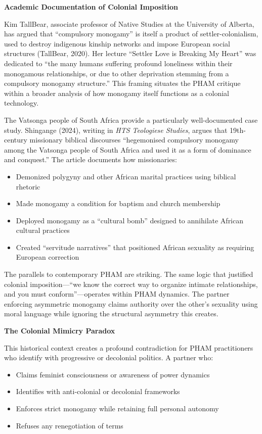 \documentclass[12pt, letterpaper]{article}
\begin{document}
\textbf{Academic Documentation of Colonial Imposition}

Kim TallBear, associate professor of Native Studies at the University of Alberta, has argued that ``compulsory monogamy'' is itself a product of settler-colonialism, used to destroy indigenous kinship networks and impose European social structures (TallBear, 2020). Her lecture ``Settler Love is Breaking My Heart'' was dedicated to ``the many humans suffering profound loneliness within their monogamous relationships, or due to other deprivation stemming from a compulsory monogamy structure.'' This framing situates the PHAM critique within a broader analysis of how monogamy itself functions as a colonial technology.

The Vatsonga people of South Africa provide a particularly well-documented case study. Shingange (2024), writing in \textit{HTS Teologiese Studies}, argues that 19th-century missionary biblical discourses ``hegemonised compulsory monogamy among the Vatsonga people of South Africa and used it as a form of dominance and conquest.'' The article documents how missionaries:

\begin{itemize}
    \item Demonized polygyny and other African marital practices using biblical rhetoric
    \item Made monogamy a condition for baptism and church membership
    \item Deployed monogamy as a ``cultural bomb'' designed to annihilate African cultural practices
    \item Created ``servitude narratives'' that positioned African sexuality as requiring European correction
\end{itemize}

The parallels to contemporary PHAM are striking. The same logic that justified colonial imposition---``we know the correct way to organize intimate relationships, and you must conform''---operates within PHAM dynamics. The partner enforcing asymmetric monogamy claims authority over the other's sexuality using moral language while ignoring the structural asymmetry this creates.

\textbf{The Colonial Mimicry Paradox}

This historical context creates a profound contradiction for PHAM practitioners who identify with progressive or decolonial politics. A partner who:

\begin{itemize}
    \item Claims feminist consciousness or awareness of power dynamics
    \item Identifies with anti-colonial or decolonial frameworks
    \item Enforces strict monogamy while retaining full personal autonomy
    \item Refuses any renegotiation of terms
\end{itemize}
\end{document}
